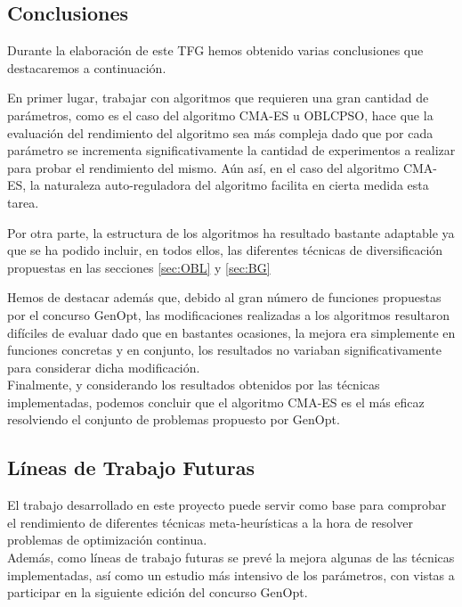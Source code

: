 
\subsection{Conclusiones}

Durante la elaboración de este TFG hemos obtenido varias conclusiones que destacaremos a continuación.

En primer lugar, trabajar con algoritmos que requieren una gran cantidad de parámetros, como es el caso del algoritmo CMA-ES u OBLCPSO, hace que la evaluación del rendimiento del algoritmo sea más compleja dado que por cada parámetro se incrementa significativamente la cantidad de experimentos a realizar para probar el rendimiento del mismo. Aún así, en el caso del algoritmo CMA-ES, la naturaleza auto-reguladora del algoritmo facilita en cierta medida esta tarea. 

Por otra parte, la estructura de los algoritmos ha resultado bastante adaptable ya que se ha podido incluir, en todos ellos, las diferentes técnicas de diversificación propuestas en las secciones \ref{sec:OBL} y \ref{sec:BG}

Hemos de destacar además que, debido al gran número de funciones propuestas por el concurso GenOpt, las modificaciones realizadas a los algoritmos resultaron difíciles de evaluar dado que en bastantes ocasiones, la mejora era simplemente en funciones concretas y en conjunto, los resultados no variaban significativamente para considerar dicha modificación.\\

Finalmente, y considerando los resultados obtenidos por las técnicas implementadas, podemos concluir que el algoritmo CMA-ES es el más eficaz resolviendo el conjunto de problemas propuesto por GenOpt.


\subsection{Líneas de Trabajo Futuras}

El trabajo desarrollado en este proyecto puede servir como base para comprobar el rendimiento de diferentes técnicas meta-heurísticas a la hora de resolver problemas de optimización continua. \\
Además, como líneas de trabajo futuras se prevé la mejora algunas de las técnicas implementadas, así como un estudio más intensivo de los parámetros, con vistas a participar en la siguiente edición del concurso GenOpt.